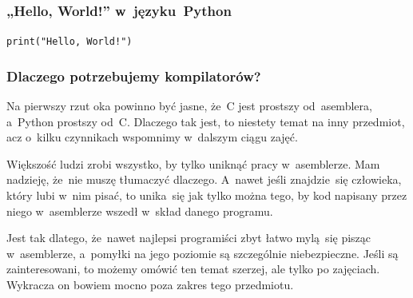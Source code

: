 \documentclass[10pt,t]{beamer}
\begin{document}
\begin{frame}
  \frametitle{„Hello, World!” w~języku~Python}


  \texttt{print("Hello, World!")}

\end{frame}




\begin{frame}
  \frametitle{Dlaczego potrzebujemy kompilatorów?}


  Na pierwszy rzut oka powinno być jasne, że~C jest prostszy od~asemblera,
  a~Python prostszy od~C. Dlaczego tak jest, to niestety temat na inny
  przedmiot, acz o~kilku czynnikach wspomnimy w~dalszym ciągu zajęć.

  Większość ludzi zrobi wszystko, by tylko uniknąć pracy w~asemblerze.
  Mam nadzieję, że~nie muszę tłumaczyć dlaczego.  A~nawet jeśli
  znajdzie~się człowieka, który lubi w~nim pisać, to unika~się jak tylko
  można tego, by kod napisany przez niego w~asemblerze wszedł w~skład
  danego programu.

  Jest tak dlatego, że~nawet najlepsi programiści zbyt łatwo mylą~się
  pisząc w~asemblerze, a~pomyłki na jego poziomie są szczególnie
  niebezpieczne. Jeśli są zainteresowani, to możemy omówić ten temat
  szerzej, ale tylko po zajęciach. Wykracza on bowiem mocno poza zakres tego
  przedmiotu.

\end{frame}
\end{document}
